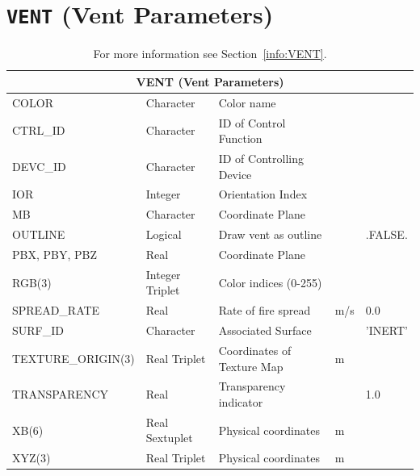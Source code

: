 \documentclass[11pt]{book}
\begin{document}
\vfill

\section{\texorpdfstring{{\tt VENT}}{VENT} (Vent Parameters)}

\hspace{1in}

\begin{table}[H]
\caption{For more information see Section~\ref{info:VENT}.}\label{tbl:VENT}
\noindent
\begin{tabularx}{\textwidth}{@{\extracolsep{\fill}}|l|l|l|l|l|}
\hline
\multicolumn{5}{|c|}{{\ct VENT} (Vent Parameters)} \\ \hline \hline
{\ct COLOR    }             & Character         & Color name                        &             &                     \\ \hline
{\ct CTRL\_ID }             & Character         & {\ct ID} of Control Function      &             &                     \\ \hline
{\ct DEVC\_ID }             & Character         & {\ct ID} of Controlling Device    &             &                     \\ \hline
{\ct IOR}                   & Integer           & Orientation Index                 &             &                     \\ \hline
{\ct MB    }                & Character         & Coordinate Plane                  &             &                     \\ \hline
{\ct OUTLINE}               & Logical           & Draw vent as outline              &             &  {\ct .FALSE.}      \\ \hline
{\ct PBX, PBY, PBZ  }       & Real              & Coordinate Plane                  &             &                     \\ \hline
{\ct RGB(3)   }             & Integer Triplet   & Color indices (0-255)             &             &                     \\ \hline
{\ct SPREAD\_RATE}          & Real              & Rate of fire spread               & m/s         &  0.0                \\ \hline
{\ct SURF\_ID}              & Character         & Associated Surface                &             &  {\ct 'INERT'}      \\ \hline
{\ct TEXTURE\_ORIGIN(3)}    & Real Triplet      & Coordinates of Texture Map        & m           &                     \\ \hline
{\ct TRANSPARENCY}          & Real              & Transparency indicator            &             &   1.0               \\ \hline
{\ct XB(6) }                & Real Sextuplet    & Physical coordinates              & m           &                     \\ \hline
{\ct XYZ(3) }               & Real Triplet      & Physical coordinates              & m           &                     \\ \hline
\end{tabularx}
\end{table}
\end{document}
